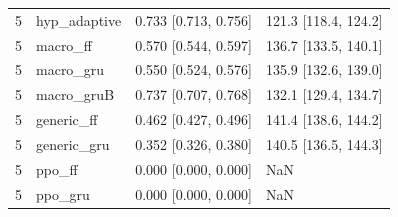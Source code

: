 \begin{tabular}{rlll}
5 & hyp\_adaptive & 0.733 [0.713, 0.756] & 121.3 [118.4, 124.2] \\
5 & macro\_ff & 0.570 [0.544, 0.597] & 136.7 [133.5, 140.1] \\
5 & macro\_gru & 0.550 [0.524, 0.576] & 135.9 [132.6, 139.0] \\
5 & macro\_gruB & 0.737 [0.707, 0.768] & 132.1 [129.4, 134.7] \\
5 & generic\_ff & 0.462 [0.427, 0.496] & 141.4 [138.6, 144.2] \\
5 & generic\_gru & 0.352 [0.326, 0.380] & 140.5 [136.5, 144.3] \\
5 & ppo\_ff & 0.000 [0.000, 0.000] & NaN \\
5 & ppo\_gru & 0.000 [0.000, 0.000] & NaN \\
\bottomrule
\end{tabular}
